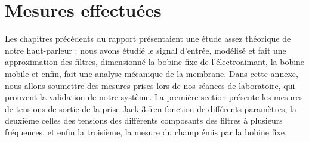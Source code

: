 \chapter{Mesures effectuées}

Les chapitres précédents du rapport présentaient une étude assez théorique de notre haut-parleur : nous avons étudié le signal d'entrée, modélisé et fait une approximation des filtres, dimensionné la bobine fixe de l'électroaimant, la bobine mobile et enfin, fait une analyse mécanique de la membrane.
Dans cette annexe, nous allons soumettre des mesures prises lors de nos séances de laboratoire, qui prouvent la validation de notre système.
La première section présente les mesures de tensions de sortie de la prise Jack $3.5$\milli\meter \,en fonction de différents paramètres, la deuxième celles des tensions des différents composants des filtres à plusieurs fréquences, et enfin la troisième, la mesure du champ émis par la bobine fixe.



